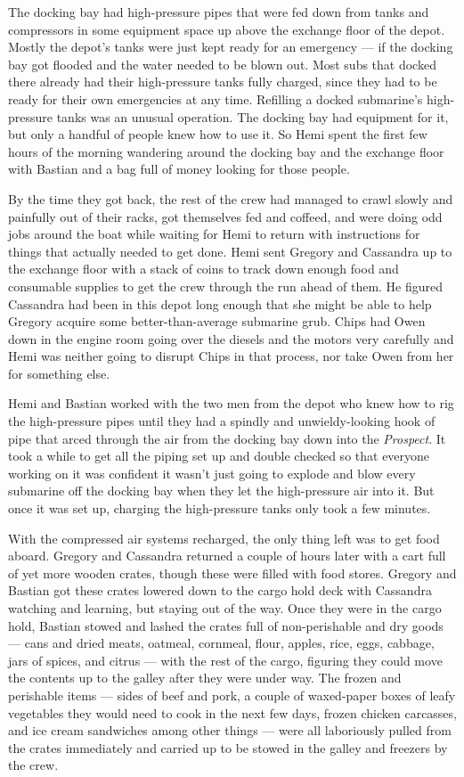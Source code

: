 \documentclass[]{scrbook}
\begin{document}
The docking bay had high-pressure pipes that were fed down from tanks
and compressors in some equipment space up above the exchange floor of
the depot. Mostly the depot's tanks were just kept ready for an
emergency --- if the docking bay got flooded and the water needed to be
blown out. Most subs that docked there already had their high-pressure
tanks fully charged, since they had to be ready for their own
emergencies at any time. Refilling a docked submarine's high-pressure
tanks was an unusual operation. The docking bay had equipment for it,
but only a handful of people knew how to use it. So Hemi spent the first
few hours of the morning wandering around the docking bay and the
exchange floor with Bastian and a bag full of money looking for those
people.

By the time they got back, the rest of the crew had managed to crawl
slowly and painfully out of their racks, got themselves fed and coffeed,
and were doing odd jobs around the boat while waiting for Hemi to return
with instructions for things that actually needed to get done. Hemi sent
Gregory and Cassandra up to the exchange floor with a stack of coins to
track down enough food and consumable supplies to get the crew through
the run ahead of them. He figured Cassandra had been in this depot long
enough that she might be able to help Gregory acquire some
better-than-average submarine grub. Chips had Owen down in the engine
room going over the diesels and the motors very carefully and Hemi was
neither going to disrupt Chips in that process, nor take Owen from her
for something else.

Hemi and Bastian worked with the two men from the depot who knew how to
rig the high-pressure pipes until they had a spindly and
unwieldy-looking hook of pipe that arced through the air from the
docking bay down into the \emph{Prospect}. It took a while to get all
the piping set up and double checked so that everyone working on it was
confident it wasn't just going to explode and blow every submarine off
the docking bay when they let the high-pressure air into it. But once it
was set up, charging the high-pressure tanks only took a few minutes.

With the compressed air systems recharged, the only thing left was to
get food aboard. Gregory and Cassandra returned a couple of hours later
with a cart full of yet more wooden crates, though these were filled
with food stores. Gregory and Bastian got these crates lowered down to
the cargo hold deck with Cassandra watching and learning, but staying
out of the way. Once they were in the cargo hold, Bastian stowed and
lashed the crates full of non-perishable and dry goods --- cans and
dried meats, oatmeal, cornmeal, flour, apples, rice, eggs, cabbage, jars
of spices, and citrus --- with the rest of the cargo, figuring they
could move the contents up to the galley after they were under way. The
frozen and perishable items --- sides of beef and pork, a couple of
waxed-paper boxes of leafy vegetables they would need to cook in the
next few days, frozen chicken carcasses, and ice cream sandwiches among
other things --- were all laboriously pulled from the crates immediately
and carried up to be stowed in the galley and freezers by the crew.
\end{document}
